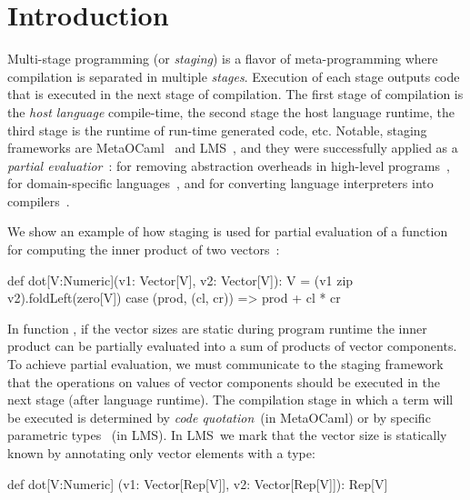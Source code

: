 \section{Introduction}
\label{sct:introduction}

 Multi-stage programming (or \emph{staging}) is a flavor of meta-programming
  where compilation is separated in multiple \emph{stages}. Execution of each
  stage outputs code that is executed in the next stage of compilation. The first
  stage of compilation is the \emph{host language} compile-time, the second stage
  the host language runtime, the third stage is the runtime of run-time generated
  code, etc. Notable, staging frameworks are MetaOCaml~\cite{taha_multi-stage_1997}
  and LMS~\cite{rompf2012lightweight}, and they were successfully applied as a
  \emph{partial evaluatior}~\cite{jones1993partial}: for removing abstraction
  overheads in high-level programs~\cite{carette2005multi,rompf2012lightweight},
  for domain-specific languages~\cite{jonnalagedda2014staged}, and for converting language
  interpreters into compilers~\cite{lancet,futamura1999partial}.

 We show an example of how staging is used for partial evaluation of a function
 for computing the inner product of two vectors~\footnotemark[1]:\begin{lstparagraph}
def dot[V:Numeric](v1: Vector[V], v2: Vector[V]): V =
  (v1 zip v2).foldLeft(zero[V]) {
    case (prod, (cl, cr)) => prod + cl * cr
  }
 \end{lstparagraph}

In function , if the vector sizes are static during program runtime the inner product can
 be partially evaluated into a sum of products of vector components. To achieve partial evaluation,
 we must communicate to the staging framework that the operations on values of vector components
 should be executed in the next stage (after language runtime). The compilation stage
 in which a term will be executed is determined by \emph{code quotation}~(in MetaOCaml)
 or by specific parametric types ~(in LMS). In LMS~\footnotemark[2] we mark
 that the vector size is statically known by annotating only vector elements with
 a  type:\begin{lstparagraph}
def dot[V:Numeric]
  (v1: Vector[Rep[V]], v2: Vector[Rep[V]]): Rep[V]
 \end{lstparagraph}

